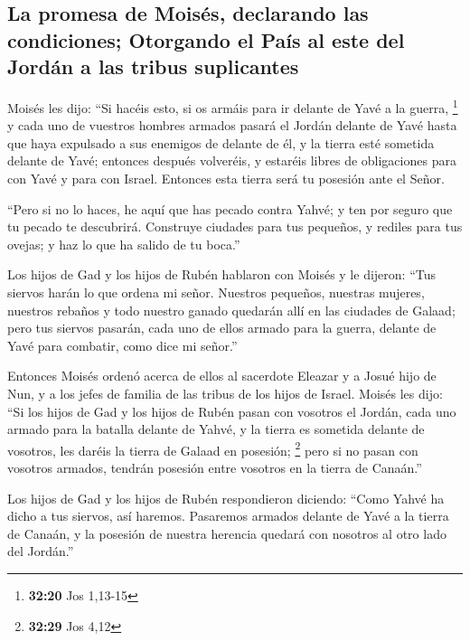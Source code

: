 \hypertarget{la-promesa-de-moisuxe9s-declarando-las-condiciones-otorgando-el-pauxeds-al-este-del-jorduxe1n-a-las-tribus-suplicantes}{%
\subsection{La promesa de Moisés, declarando las condiciones; Otorgando
el País al este del Jordán a las tribus
suplicantes}\label{la-promesa-de-moisuxe9s-declarando-las-condiciones-otorgando-el-pauxeds-al-este-del-jorduxe1n-a-las-tribus-suplicantes}}

 Moisés les dijo: ``Si hacéis esto, si os armáis para ir
delante de Yavé a la guerra, \footnote{\textbf{32:20} Jos 1,13-15}
 y cada uno de vuestros hombres armados pasará el Jordán
delante de Yavé hasta que haya expulsado a sus enemigos de delante de
él,  y la tierra esté sometida delante de Yavé; entonces
después volveréis, y estaréis libres de obligaciones para con Yavé y
para con Israel. Entonces esta tierra será tu posesión ante el Señor.

 ``Pero si no lo haces, he aquí que has pecado contra
Yahvé; y ten por seguro que tu pecado te descubrirá. 
Construye ciudades para tus pequeños, y rediles para tus ovejas; y haz
lo que ha salido de tu boca.''

 Los hijos de Gad y los hijos de Rubén hablaron con
Moisés y le dijeron: ``Tus siervos harán lo que ordena mi señor.
 Nuestros pequeños, nuestras mujeres, nuestros rebaños y
todo nuestro ganado quedarán allí en las ciudades de Galaad;
 pero tus siervos pasarán, cada uno de ellos armado para
la guerra, delante de Yavé para combatir, como dice mi señor.''

 Entonces Moisés ordenó acerca de ellos al sacerdote
Eleazar y a Josué hijo de Nun, y a los jefes de familia de las tribus de
los hijos de Israel.  Moisés les dijo: ``Si los hijos de
Gad y los hijos de Rubén pasan con vosotros el Jordán, cada uno armado
para la batalla delante de Yahvé, y la tierra es sometida delante de
vosotros, les daréis la tierra de Galaad en posesión; \footnote{\textbf{32:29}
  Jos 4,12}  pero si no pasan con vosotros armados,
tendrán posesión entre vosotros en la tierra de Canaán.''

 Los hijos de Gad y los hijos de Rubén respondieron
diciendo: ``Como Yahvé ha dicho a tus siervos, así haremos.
 Pasaremos armados delante de Yavé a la tierra de Canaán,
y la posesión de nuestra herencia quedará con nosotros al otro lado del
Jordán.''

